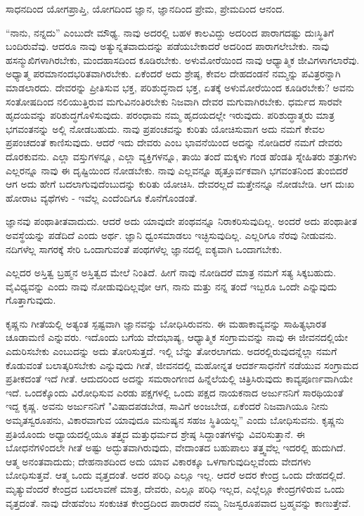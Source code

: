 ಸಾಧನದಿಂದ ಯೋಗಪ್ರಾಪ್ತಿ, ಯೋಗದಿಂದ ಜ್ಞಾನ, ಜ್ಞಾನದಿಂದ ಪ್ರೇಮ, ಪ್ರೇಮದಿಂದ ಆನಂದ.

“ನಾನು, ನನ್ನದು” ಎಂಬುದೇ ಮೌಢ್ಯ. ನಾವು ಅದರಲ್ಲಿ ಬಹಳ ಕಾಲವಿದ್ದು ಅದರಿಂದ ಪಾರಾಗದಷ್ಟು ದುಃಸ್ಥಿತಿಗೆ ಬಂದಿರುವೆವು. ಆದರೂ ನಾವು ಅತ್ಯುನ್ನತವಾದುದನ್ನು ಪಡೆಯಬೇಕಾದರೆ ಅದರಿಂದ ಪಾರಾಗಲೇಬೇಕು. ನಾವು ಹಸನ್ಮುಖಿಗಳಾಗಿರಬೇಕು, ಮಂದಹಾಸದಿಂದ ಕೂಡಿರಬೇಕು. ಅಳುಮೋರೆಯಿಂದ ನಾವು ಆಧ್ಯಾತ್ಮಿಕ ಜೀವಿಗಳಾಗಲಾರೆವು. ಅಧ್ಯಾತ್ಮ ಪರಮಾನಂದಭರಿತವಾಗಿರಬೇಕು. ಏಕೆಂದರೆ ಅದು ಶ್ರೇಷ್ಠ, ಕೇವಲ ದೇಹದಂಡನೆ ನಮ್ಮನ್ನು ಪವಿತ್ರರನ್ನಾಗಿ ಮಾಡಲಾರದು. ದೇವರನ್ನು ಪ್ರೀತಿಸುವ ಭಕ್ತ, ಪರಿಶುದ್ಧನಾದ ಭಕ್ತ, ಏತಕ್ಕೆ ಅಳುಮೋರೆಯಿಂದ ಕೂಡಿರಬೇಕು? ಅವನು ಸಂತೋಷದಿಂದ ನಲಿಯುತ್ತಿರುವ ಮಗುವಿನಂತಿರಬೇಕು ನಿಜವಾಗಿ ದೇವರ ಮಗುವಾಗಿರಬೇಕು. ಧರ್ಮದ ಸಾರವೇ ಹೃದಯವನ್ನು ಪರಿಶುದ್ಧಗೊಳಿಸುವುದು. ಪರಂಧಾಮ ನಮ್ಮ ಹೃದಯದಲ್ಲೇ ಇರುವುದು. ಪರಿಶುದ್ಧಾತ್ಮರು ಮಾತ್ರ ಭಗವಂತನನ್ನು ಅಲ್ಲಿ ನೋಡಬಹುದು. ನಾವು ಪ್ರಪಂಚವನ್ನು ಕುರಿತು ಯೋಚಿಸುವಾಗ ಅದು ನಮಗೆ ಕೇವಲ ಪ್ರಪಂಚದಂತೆ ಕಾಣಿಸುವುದು. ಆದರೆ ಇದು ದೇವರು ಎಂಬ ಭಾವನೆಯಿಂದ ಅದನ್ನು ನೋಡಿದರೆ ನಮಗೆ ದೇವರು ದೊರಕುವನು. ಎಲ್ಲಾ ವಸ್ತುಗಳನ್ನೂ, ಎಲ್ಲಾ ವ್ಯಕ್ತಿಗಳನ್ನೂ, ತಾಯಿ ತಂದೆ ಮಕ್ಕಳು ಗಂಡ ಹೆಂಡತಿ ಸ್ನೇಹಿತರು ಶತ್ರುಗಳು ಎಲ್ಲರನ್ನೂ ನಾವು ಈ ದೃಷ್ಟಿಯಿಂದ ನೋಡಬೇಕು. ನಾವು ಎಲ್ಲವನ್ನೂ ಹೃತ್ತೂರ್ವಕವಾಗಿ ಭಗವಂತನಿಂದ ತುಂಬಿದರೆ ಆಗ ಅದು ಹೇಗೆ ಬದಲಾಗುವುದೆಂಬುದನ್ನು ಕುರಿತು ಯೋಚಿಸಿ. ದೇವರಲ್ಲದೆ ಮತ್ತೇನನ್ನೂ ನೋಡಬೇಡಿ. ಆಗ ದುಃಖ ಹೋರಾಟ ವ್ಯಥೆಗಳು - ಇವೆಲ್ಲ ಎಂದೆಂದಿಗೂ ಕೊನೆಗೊಂಡಂತೆ.

ಜ್ಞಾನವು ಪಂಥಾತೀತವಾದುದು. ಆದರೆ ಅದು ಯಾವುದೇ ಪಂಥವನ್ನೂ ನಿರಾಕರಿಸುವುದಿಲ್ಲ. ಅಂದರೆ ಅದು ಪಂಥಾತೀತ ಅವಸ್ಥೆಯನ್ನು ಪಡೆದಿದೆ ಎಂದು ಅರ್ಥ. ಜ್ಞಾನಿ ಧ್ವಂಸಮಾಡಲು ಇಚ್ಛಿಸುವುದಿಲ್ಲ. ಎಲ್ಲರಿಗೂ ನೆರವು ನೀಡುವನು. ನದಿಗಳೆಲ್ಲ ಸಾಗರಕ್ಕೆ ಸೇರಿ ಒಂದಾಗುವಂತೆ ಪಂಥಗಳೆಲ್ಲ ಜ್ಞಾನದಲ್ಲಿ ಐಕ್ಯವಾಗಿ ಒಂದಾಗಬೇಕು.

\newpage

ಎಲ್ಲದರ ಅಸ್ತಿತ್ವ ಬ್ರಹ್ಮನ ಅಸ್ತಿತ್ವದ ಮೇಲೆ ನಿಂತಿದೆ. ಹೀಗೆ ನಾವು ನೋಡಿದರೆ ಮಾತ್ರ ನಮಗೆ ಸತ್ಯ ಸಿಕ್ಕಬಹುದು. ವೈವಿಧ್ಯವನ್ನು ಎಂದು ನಾವು ನೋಡುವುದಿಲ್ಲವೋ ಆಗ, ನಾನು ಮತ್ತು ನನ್ನ ತಂದೆ ಇಬ್ಬರೂ ಒಂದೇ ಎನ್ನುವುದು ಗೊತ್ತಾಗುವುದು.

ಕೃಷ್ಣನು ಗೀತೆಯಲ್ಲಿ ಅತ್ಯಂತ ಸ್ಪಷ್ಟವಾಗಿ ಜ್ಞಾನವನ್ನು ಬೋಧಿಸಿರುವನು. ಈ ಮಹಾಕಾವ್ಯವನ್ನು ಸಾಹಿತ್ಯಭಾರತ ಚೂಡಾಮಣಿ ಎನ್ನುವರು. ಇದೊಂದು ಬಗೆಯ ವೇದಭಾಷ್ಯ, ಆಧ್ಯಾತ್ಮಿಕ ಸಂಗ್ರಾಮವನ್ನು ನಾವು ಈ ಜೀವನದಲ್ಲಿಯೇ ಎದುರಿಸಬೇಕು ಎಂಬುದನ್ನು ಅದು ತೋರಿಸುತ್ತದೆ. ಇಲ್ಲಿ ಬೆನ್ನು ತೋರಲಾಗದು. ಅದರಲ್ಲಿರುವುದನ್ನೆಲ್ಲಾ ನಮಗೆ ಕೊಡುವಂತೆ ಬಲಾತ್ಕರಿಸಬೇಕು ಎನ್ನುವುದು ಗೀತೆ, ಜೀವನದಲ್ಲಿ ಮಹೋನ್ನತ ಆದರ್ಶಸಾಧನೆಗೆ ನಡೆಯುವ ಸಂಗ್ರಾಮದ ಪ್ರತೀಕದಂತೆ ಇದೆ ಗೀತೆ. ಆದುದರಿಂದ ಅದನ್ನು ಸಮರಾಂಗಣದ ಹಿನ್ನೆಲೆಯಲ್ಲಿ ಚಿತ್ರಿಸಿರುವುದು ಕಾವ್ಯಪೂರ್ಣವಾಗಿಯೇ ಇದೆ. ಒಂದಕ್ಕೊಂದು ವಿರೋಧಿಸುವ ಎರಡು ಪಕ್ಷಗಳಲ್ಲಿ ಒಂದು ಪಕ್ಷದ ನಾಯಕನಾದ ಅರ್ಜುನನಿಗೆ ಸಾರಥಿಯಂತೆ ಇದ್ದ ಕೃಷ್ಣ. ಅವನು ಅರ್ಜುನನಿಗೆ "ವಿಷಾದಪಡಬೇಡ, ಸಾವಿಗೆ ಅಂಜಬೇಡ, ಏಕೆಂದರೆ ನಿಜವಾಗಿಯೂ ನೀನು ಅಮೃತಸ್ವರೂಪನು, ವಿಕಾರವಾಗುವ ಯಾವುದೂ ಮನುಷ್ಯನ ಸಹಜ ಸ್ಥಿತಿಯಲ್ಲ'' ಎಂದು ಬೋಧಿಸುವನು. ಕೃಷ್ಣನು ಪ್ರತಿಯೊಂದು ಅಧ್ಯಾಯದಲ್ಲಿಯೂ ತತ್ತ್ವದ ಮತ್ತು\break ಧರ್ಮದ ಶ್ರೇಷ್ಠ ಸಿದ್ದಾಂತಗಳನ್ನು ವಿವರಿಸುತ್ತಾನೆ. ಈ ಬೋಧನೆಗಳಿಂದಲೇ ಗೀತೆ ಅಷ್ಟು ಅದ್ಭುತವಾಗಿರುವುದು, ವೇದಾಂತದ ಬಹುಪಾಲು ತತ್ತ್ವವೆಲ್ಲ ಇದರಲ್ಲಿ ಹುದುಗಿದೆ. ಆತ್ಮ ಅನಂತವಾದುದು; ದೇಹನಾಶದಿಂದ ಅದು ಯಾವ ವಿಕಾರಕ್ಕೂ ಒಳಗಾಗುವುದಿಲ್ಲವೆಂದು ವೇದಗಳು ಬೋಧಿಸುತ್ತವೆ. ಆತ್ಮ ಒಂದು ವೃತ್ತದಂತೆ. ಅದರ ಪರಿಧಿ ಎಲ್ಲೂ ಇಲ್ಲ. ಆದರೆ ಅದರ ಕೇಂದ್ರ ಒಂದು ದೇಹದಲ್ಲಿದೆ. ಮೃತ್ಯುವೆಂದರೆ ಕೇಂದ್ರದ ಬದಲಾವಣೆ ಮಾತ್ರ, ದೇವರು, ಎಲ್ಲೂ ಪರಿಧಿ ಇಲ್ಲದ, ಎಲ್ಲೆಲ್ಲೂ ಕೇಂದ್ರಗಳಿರುವ ಒಂದು ವೃತ್ತದಂತೆ. ನಾವು ದೇಹವೆಂಬ ಸಂಕುಚಿತ ಕೇಂದ್ರದಿಂದ ಪಾರಾದರೆ ನಮ್ಮ ನಿಜಸ್ವರೂಪವಾದ ಬ್ರಹ್ಮವನ್ನು ಕಾಣುತ್ತೇವೆ.

